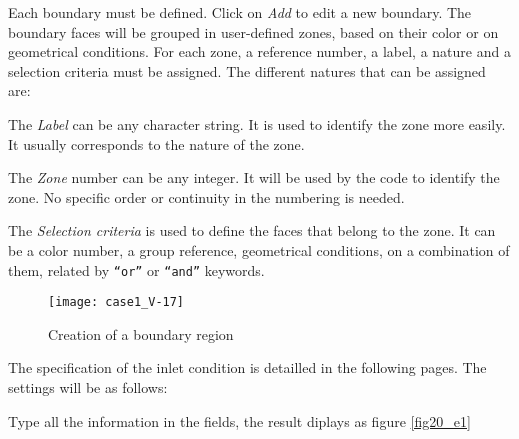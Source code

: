 \clearpage
Each boundary must be defined. Click on {\itshape Add} to edit a new boundary.
The boundary faces will be grouped in
user-defined zones, based on their color or on geometrical conditions. For each
zone, a reference number, a label, a nature and a selection criteria must be
assigned.
The different natures that can be assigned are:\\

The {\itshape Label} can be any character string. It is used to identify the
zone more easily. It usually corresponds to the nature of the zone.

The {\itshape Zone} number can be any integer. It will be used by the code to
identify the zone. No specific order or continuity in the numbering is needed.

The {\itshape Selection criteria} is used to define the faces that belong to the
zone. It can be a color number, a group reference, geometrical conditions, on a
combination of them, related by \texttt{``or''} or \texttt{``and''} keywords.

\begin{figure}[ht]
\begin{center}
\texttt{[image: case1\_V-17]}
\caption{Creation of a boundary region}
\label{fig21_e1}
\end{center}
\end{figure}


\clearpage
The specification of the inlet condition is detailled in the following
pages. The settings will be as follows:\\

Type all the information in the fields, the result diplays as figure \ref{fig20_e1}

